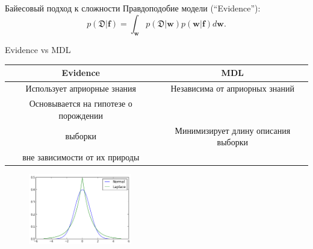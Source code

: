 \documentclass[10pt,pdf,utf8,russian,aspectratio=169]{beamer}
\begin{document}
\begin{frame}{Байесовый подход к сложности}
Правдоподобие модели (``Evidence''):
\[
	p(\mathfrak{D}|\mathbf{f}) = \int_\mathbf{w} p(\mathfrak{D}|\mathbf{w})p(\mathbf{w}|\mathbf{f}) d\mathbf{w}.
\]


\begin{figure}
  \centering
\label{fig:1}\qquad

\end{figure}


\end{frame}

\begin{frame}{Evidence vs MDL}
\begin{tabular}{ c | c  }
  \hline			
 \bf Evidence & \bf MDL \\
  \hline  
Использует априорные знания &  Независима от априорных знаний \\
  \hline  
Основывается на гипотезе о порождении\\ выборки & Минимизирует длину описания выборки\\ вне зависимости от их природы \\
  \hline  

\end{tabular}


\begin{figure}
  \centering
 \includegraphics[width=0.4\textwidth]{laplace.png}
\label{fig:1}\qquad

\end{figure}


\end{frame}
\end{document}
